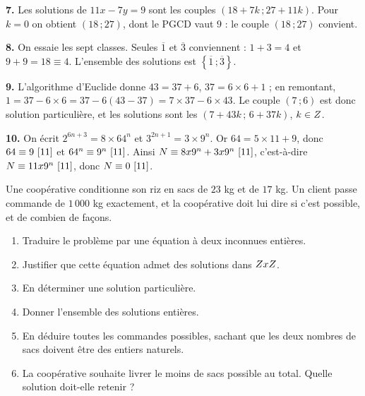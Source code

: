 \begin{corrige}[annales]
\textbf{7.} Les solutions de $11x-7y = 9$ sont les couples
$(18+7k\,;27+11k)$. Pour $k = 0$ on obtient $(18\,;27)$, dont le PGCD vaut
$9$ : le couple $(18\,;27)$ convient.

\textbf{8.} On essaie les sept classes. Seules $\overline1$ et $\overline3$
conviennent : $1+3 = 4$ et $9+9 = 18 \equiv 4$. L'ensemble des solutions est
$\left\{\overline1\,;\overline3\right\}$.

\textbf{9.} L'algorithme d'Euclide donne $43 = 37+6$, $37 = 6\times6+1$ ; en
remontant, $1 = 37-6\times6 = 37-6(43-37) = 7\times37-6\times43$. Le couple
$(7\,;6)$ est donc solution particulière, et les solutions sont les
$(7+43k\,;\,6+37k)$, $k \in Z$.

\textbf{10.} On écrit $2^{6n+3} = 8\times64^{n}$ et
$3^{2n+1} = 3\times9^{n}$. Or $64 = 5\times11+9$, donc
$64 \equiv 9 \ [11]$ et $64^{n} \equiv 9^{n} \ [11]$. Ainsi
$N \equiv 8x9^{n}+3x9^{n} \ [11]$, c'est-à-dire
$N \equiv 11x9^{n} \ [11]$, donc $N \equiv 0 \ [11]$.
\end{corrige}

\begin{jecherche}
Une coopérative conditionne son riz en sacs de $23$ kg et de $17$ kg. Un
client passe commande de $1\,000$ kg exactement, et la coopérative doit lui
dire si c'est possible, et de combien de façons.

\begin{enumerate}[label=\textbf{\arabic*.}, leftmargin=*, itemsep=0.3em]
  \item Traduire le problème par une équation à deux inconnues entières.
  \item Justifier que cette équation admet des solutions dans $ZxZ$.
  \item En déterminer une solution particulière.
  \item Donner l'ensemble des solutions entières.
  \item En déduire toutes les commandes possibles, sachant que les deux
        nombres de sacs doivent être des entiers naturels.
  \item La coopérative souhaite livrer le moins de sacs possible au total.
        Quelle solution doit-elle retenir ?
\end{enumerate}
\end{jecherche}

